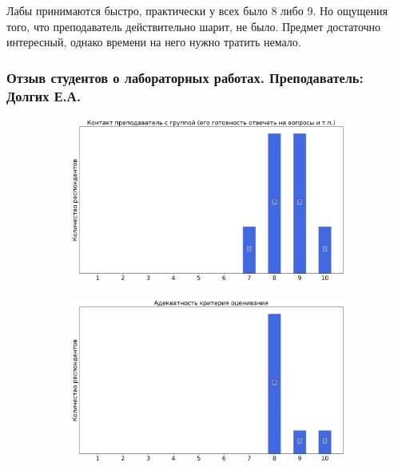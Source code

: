             \begin{commentbox} 
                Лабы принимаются быстро, практически у всех было 8 либо 9. Но ощущения того, что  преподаватель действительно шарит, не было. Предмет достаточно интересный, однако времени на него нужно тратить немало. 
            \end{commentbox}
        
        
    \subsubsection{Отзыв студентов о лабораторных работах. Преподаватель: Долгих Е.А.}
        \begin{figure}[H]
            \centering
            \begin{subfigure}[b]{0.45\textwidth}
                \centering
                \includegraphics[width=\textwidth]{images/1 course/Общая физика - механика/labniks-marks-Долгих Е.А.-0.png}
            \end{subfigure}
            \begin{subfigure}[b]{0.45\textwidth}
                \centering
                \includegraphics[width=\textwidth]{images/1 course/Общая физика - механика/labniks-marks-Долгих Е.А.-1.png}

\end{subfigure}
\end{figure}
